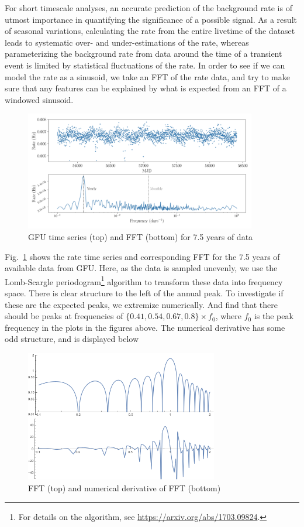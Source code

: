 For short timescale analyses, an accurate prediction of the background rate is of utmost importance in quantifying the significance of a possible signal. As a result of seasonal variations, calculating the rate from the entire livetime of the dataset leads to systematic over- and under-estimations of the rate, whereas parameterizing the background rate from data around the time of a transient event is limited by statistical fluctuations of the rate. In order to see if we can model the rate as a sinusoid, we take an FFT of the rate data, and try to make sure that any features can be explained by what is expected from an FFT of a windowed sinusoid.
\begin{figure}
    \centering
    \includegraphics[width=0.9\textwidth]{images/gfu_sample_sidebyside.png}
    \caption{GFU time series (top) and FFT (bottom) for 7.5 years of data}
    \label{fig:gfu_7_year_fft}
\end{figure}

Fig.~\ref{fig:gfu_7_year_fft} shows the rate time series and corresponding FFT for the 7.5 years of available data from GFU. Here, as the data is sampled unevenly, we use the Lomb-Scargle periodogram\footnote{For details on the algorithm, see \url{https://arxiv.org/abs/1703.09824}.} algorithm to transform these data into frequency space. There is clear structure to the left of the annual peak. To investigate if these are the expected peaks, we extremize numerically. And find that there should be peaks at frequencies of $\{0.41,0.54,0.67,0.8\}\times f_0$, where $f_0$ is the peak frequency in the plots in the figures above. The numerical derivative has some odd structure, and is displayed below

\begin{figure}
    \centering
    \includegraphics[width=0.75\textwidth]{images/GFU_fft_with_derivative.png}
    \caption{FFT (top) and numerical derivative of FFT (bottom)}
    \label{fig:fft_derivative}
\end{figure}

